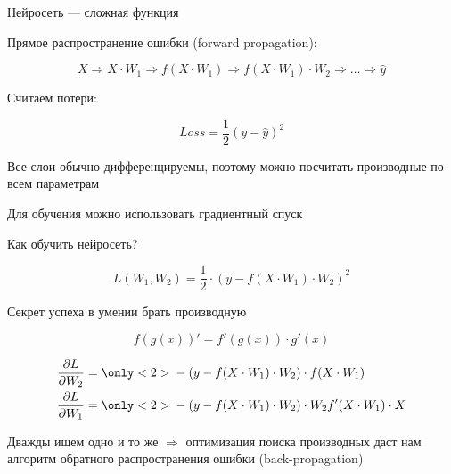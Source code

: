 \documentclass[notes,12pt, aspectratio=169]{beamer}
\newenvironment{wideitemize}{\itemize\addtolength{\itemsep}{10pt}}{\enditemize}
\begin{document}
\begin{frame}{Нейросеть —  сложная функция}
	\begin{wideitemize}
	\item Прямое распространение ошибки (forward propagation): 
	
	\[ X \Rightarrow X \cdot W_1 \Rightarrow f(X \cdot W_1) \Rightarrow f(X \cdot W_1) \cdot W_2 \Rightarrow \ldots \Rightarrow \hat{y} \]
	
	\item Считаем потери:
	
	\[Loss = \frac{1}{2} (y - \hat y)^2\]
	
	\item Все слои обычно дифференцируемы, поэтому можно посчитать производные по всем параметрам
	
	\item Для обучения можно использовать градиентный спуск
	\end{wideitemize}
\end{frame}


\begin{frame}{Как обучить нейросеть?}

\[ L(W_1, W_2) =  \frac{1}{2} \cdot (y - f(X \cdot W_1) \cdot W_2)^2\]

\begin{center}
\alert{Секрет успеха в умении брать производную}
\end{center}

\pause

\[ \boxed{ f(g(x))' = f'(g(x)) \cdot g'(x) }  \]

\pause

\begin{equation*} 
\begin{aligned} 
\frac{\partial L}{\partial W_2} &=   { \only<2>{ \color{red}} - (y - f(X \cdot W_1) \cdot W_2) } \cdot f(X \cdot W_1) \\
\frac{\partial L}{\partial W_1} &= { \only<2>{ \color{red}}  - (y - f(X \cdot W_1) \cdot W_2) } \cdot W_2 f'(X \cdot W_1) \cdot X 
\end{aligned}
\end{equation*}

\vfill

\pause

\alert{Дважды ищем одно и то же $\Rightarrow$ оптимизация поиска производных даст нам алгоритм обратного распространения ошибки (back-propagation)}
\end{frame}
\end{document}
